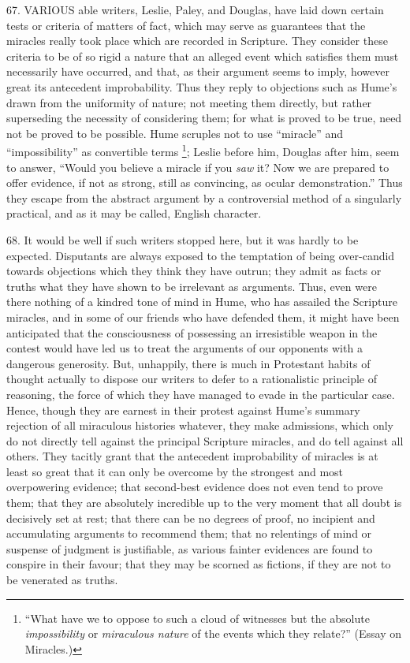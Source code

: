 
67.
VARIOUS able writers, Leslie,
Paley, and Douglas, have laid down certain tests or criteria of
matters of fact, which may serve as guarantees that the miracles
really took place which are recorded in Scripture. They consider these
criteria to be of so rigid a nature that an alleged event which
satisfies them must necessarily have occurred, and that, as their
argument seems to imply, however great its antecedent improbability.
Thus they reply to objections such as Hume's drawn from the uniformity
of nature; not meeting them directly, but rather superseding the
necessity of considering them; for what is proved to be true, need not
be proved to be possible. Hume scruples not to use ``miracle'' and ``impossibility''
as convertible terms \footnote{``What have we to oppose to such a cloud of
witnesses but the absolute \emph{impossibility} or \emph{miraculous
nature} of the events which they relate?'' (Essay on Miracles.)};
Leslie before him, Douglas after him, seem to answer, ``Would you
believe a miracle if you \emph{saw} it? Now we are prepared to offer
evidence, if not as strong, still as convincing, as ocular
demonstration.'' Thus they escape from the abstract argument by a
controversial method of a singularly practical, and as it may be
called, English character.

68.
It would be well if such writers stopped here, but it was hardly to be
expected. Disputants are always exposed to the temptation of being
over-candid towards objections which they think they have outrun; they
admit as facts or truths what they have shown to be irrelevant as
arguments. Thus, even were there nothing of a kindred tone of mind in
Hume, who has assailed the Scripture miracles, and in some of our
friends who have defended them, it might have been anticipated that
the consciousness of possessing an irresistible weapon in the contest
would have led us to treat the arguments of our opponents with a
dangerous generosity. But, unhappily, there is much in Protestant
habits of thought actually to dispose our writers to defer to a
rationalistic principle of reasoning, the force of which they have
managed to evade in the particular case. Hence, though they are
earnest in their protest against Hume's summary rejection of all
miraculous histories whatever, they make admissions, which only do not
directly tell against the principal Scripture miracles, and do tell
against all others. They tacitly grant that the antecedent
improbability of miracles is at least so great that it can only be
overcome by the strongest and most overpowering evidence; that
second-best evidence does not even tend to prove them; that they are
absolutely incredible up to the very moment that all doubt is
decisively set at rest; that there can be no degrees of proof, no
incipient and accumulating arguments to recommend them; that no
relentings of mind or suspense of judgment is justifiable, as various
fainter evidences are found to conspire in their favour; that they may
be scorned as fictions, if they are not to be venerated as truths.

